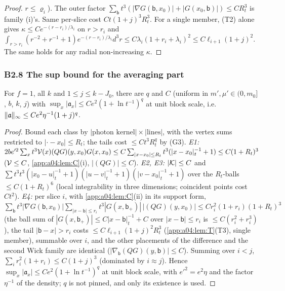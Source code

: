 \begin{proof}
$r\le\varrho_i$). The outer factor $\sum_{\mathsf b}t^3(|\nabla G(\mathsf b,x_0)|+|G(x_0,\mathsf b)|)\le CR_t^3$ is family (i)'s. Same per-slice cost $Ct(1+j)^3R_t^3$. For a single member, (T2) alone gives $\kappa\le Ce^{-(r-r_i)/\lambda_i}$ on $r>r_i$ and $\int_{r>r_i}(r^{-2}+r^{-1}+1)e^{-(r-r_i)/\lambda_i}d^3r\le C\lambda_i(1+r_i+\lambda_i)^2\le C\ell_{i+1}(1+j)^2$. The same holds for any radial non-increasing $\kappa$.
\end{proof}

\subsubsection*{B2.8 The sup bound for the averaging part}

\begin{proposition}\label{app:a04:prop:AVa}
For $f=1$, all $k$ and $1\le j\le k-J_0$, there are $q$ and $C$ (uniform in $m',\mu'\in(0,m_0]$, $b$, $k$, $j$) with $\sup_x|\mathfrak a_x|\le Ce^2(1+\ln t^{-1})^q$ at unit block scale, i.e.\ $\lVert \mathfrak a\rVert_\infty\le Ce^2\eta^{-1}(1+j)^q$.
\end{proposition}
\begin{proof}
Bound each class by $|\text{photon kernel}|\times|\text{lines}|$, with the vertex sums restricted to $|\cdot-x_0|\le R_t$; the tails cost $\le Ct^3R_t^q$ by (G3). \emph{E1:} $2be'^2\sum_xt^3\mathcal V(x)(QG)(y,x_0)G(x,x_0)\le C\sum_{|x-x_0|\le R_t}t^3(|x-x_0|_t^{-1}+1)\le C(1+R_t)^3$ ($\mathcal V\le C$, \cref{app:a04:lem:C}(i), $|(QG)|\le C$). \emph{E2, E3:} $|\mathcal K|\le C$ and $\sum t^3t^3(|x_0-u|_t^{-1}+1)(|u-v|_t^{-1}+1)(|v-x_0|_t^{-1}+1)$ over the $R_t$-balls $\le C(1+R_t)^6$ (local integrability in three dimensions; coincident points cost $Ct^2$). \emph{E4:} per slice $i$, with \cref{app:a04:lem:C}(ii) in its support form, $\sum_{\mathsf b}t^3|\nabla G(\mathsf b,x_0)|\sum_{|x-\mathsf b|\le r_i}t^3|G(x,\mathsf b_+)|\,|(QG)(y,x_0)|\le Cr_i^2(1+r_i)(1+R_t)^3$ (the ball sum of $|G(x,\mathsf b_+)|\le C|x-\mathsf b|_t^{-1}+C$ over $|x-\mathsf b|\le r_i$ is $\le C(r_i^2+r_i^3)$), the tail $|\mathsf b-x|>r_i$ costs $\le C\ell_{i+1}(1+j)^2R_t^3$ (\cref{app:a04:lem:T}(T3), single member), summable over $i$, and the other placements of the difference and the second Wick family are identical ($|\nabla_{\mathsf b}(QG)(y,\mathsf b)|\le C$). Summing over $i<j$, $\sum_ir_i^2(1+r_i)\le C(1+j)^3$ (dominated by $i\approx j$). Hence $\sup_x|\mathfrak a_x|\le Ce^2(1+\ln t^{-1})^q$ at unit block scale, with $e'^2=e^2\eta$ and the factor $\eta^{-1}$ of the density; $q$ is not pinned, and only its existence is used.
\end{proof}
